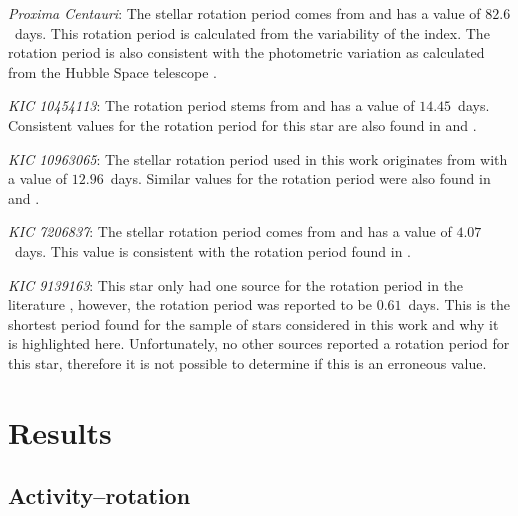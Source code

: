 \textit{Proxima Centauri}: The stellar rotation period comes from \citet{Collins_etal_2017} and has a value of $82.6$~days. This rotation period is calculated from the variability of the \Halpha index. The rotation period is also consistent with the photometric variation as calculated from the Hubble Space telescope \citep{Benedict_etal_1998}.

\textit{KIC 10454113}: The rotation period stems from \citet{McQuillan_etal_2014} and has a value of $14.45$~days. Consistent values for the rotation period for this star are also found in \citet{do_Nascimento_etal_2014} and \citet{Nielsen_etal_2013}.

\textit{KIC 10963065}: The stellar rotation period used in this work originates from \citet{Paz_Chinchon_etal_2015} with a value of $12.96$~days. Similar values for the rotation period were also found in \citet{McQuillan_etal_2013} and \citet{Mazeh_etal_2015}.

\textit{KIC 7206837}: The stellar rotation period comes from \citet{McQuillan_etal_2014} and has a value of $4.07$~days. This value is consistent with the rotation period found in \citet{Nielsen_etal_2013}.

\textit{KIC 9139163}: This star only had one source for the rotation period in the literature \citep{Janes_2017}, however, the rotation period was reported to be $0.61$~days. This is the shortest period found for the sample of stars considered in this work and why it is highlighted here. Unfortunately, no other sources reported a rotation period for this star, therefore it is not possible to determine if this is an erroneous value.

\section{Results}

\subsection{Activity--rotation}
\label{Chp5_results_activity_rotation}

